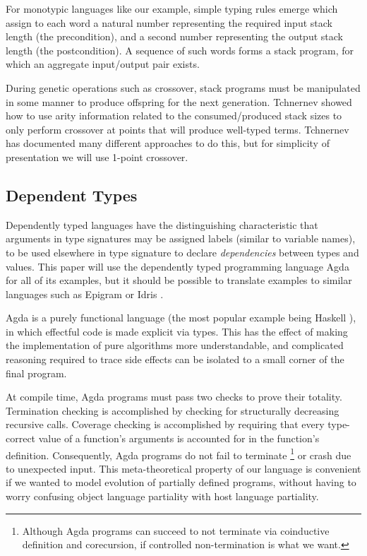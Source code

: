 \documentclass[runningheads,a4paper]{llncs}
\begin{document}
For monotypic languages like our example, simple typing rules
emerge which assign to each word a natural number representing the
required input stack length (the precondition), and a second number representing
the output stack length (the postcondition). A sequence of such words forms a stack
program, for which an aggregate input/output pair exists.

During genetic operations such as crossover, stack programs must be
manipulated in some manner to produce offspring for the next
generation. Tchnernev \cite{tchernev:forthcross} showed how to use arity
information related to the consumed/produced stack sizes to only
perform crossover at points that will produce well-typed
terms. Tchnernev \cite{tchernev:crossmethods} has documented many different
approaches to do this, but for simplicity of presentation we will use
1-point crossover.

\subsection{Dependent Types}

Dependently typed languages have the distinguishing characteristic
that arguments in type signatures may be assigned labels (similar to
variable names), to be used elsewhere in type signature to declare
\textit{dependencies} between types and values. This paper will use the
dependently typed programming language Agda \cite{norell:agdatut} for
all of its examples, but it should be possible to translate examples
to similar languages such as Epigram \cite{mcbride:epigram} or
Idris \cite{brady:idris}.

Agda is a purely functional language (the most popular example being
Haskell \cite{spj:haskell}), in which effectful code is made explicit via
types. This has the effect of making the implementation of pure algorithms
more understandable, and complicated reasoning required to trace side
effects can be isolated to a small corner of the final program.

At compile time, Agda programs must pass two checks to prove their
totality. Termination checking is accomplished by checking
for structurally decreasing recursive calls. Coverage checking is
accomplished by requiring that every type-correct value of a function's
arguments is accounted for in the function's definition.
Consequently, Agda programs do not fail to terminate
\footnote{Although Agda programs can succeed to not terminate via
  coinductive definition and corecursion, if controlled
  non-termination is what we want.}
or crash due to unexpected input. This meta-theoretical property of
our language is convenient if we wanted to model evolution of
partially defined programs, without having to worry confusing object
language partiality with host language partiality.
\end{document}
